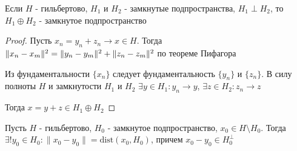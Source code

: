 \documentclass[a4paper,12pt]{report}
\newcommand*{\hm}[1]{#1\nobreak\discretionary{}%
            {\hbox{$\mathsurround=0pt #1$}}{}}
\begin{document}
\begin{prop}
Если $H$ - гильбертово, $H_1$ и $H_2$ - замкнутые подпространства, $H_1\perp H_2$, то $H_1\oplus H_2$  - замкнутое подпространство
\end{prop}
\begin{proof}
Пусть $x_n=y_n+z_n\to x\in H$. Тогда $\|x_n-x_m\|^2=\|y_n\hm-y_m\|^2+\|z_n-z_m\|^2$ по теореме Пифагора

Из фундаментальности $\{x_n\}$ следует фундаментальность $\{y_n\}$ и $\{z_n\}$. В силу полноты $H$ и замкнутости $H_1$ и $H_2$ $\exists y\in H_1\colon y_n\to y$, $\exists z\in H_2\colon z_n\to z$

Тогда $x=y+z\in H_1\oplus H_2$
\end{proof}
 


\begin{thm}
Пусть $H$ - гильбертово, $H_0$ - замкнутое подпространство, $x_0\in H\setminus H_0$. Тогда $\exists!y_0\in H_0\colon\|x_0-y_0\|=\mathrm{dist}(x_0,H_0)$, причем $x_0-y_0\in H_0^\perp$
\end{thm}
\end{document}
